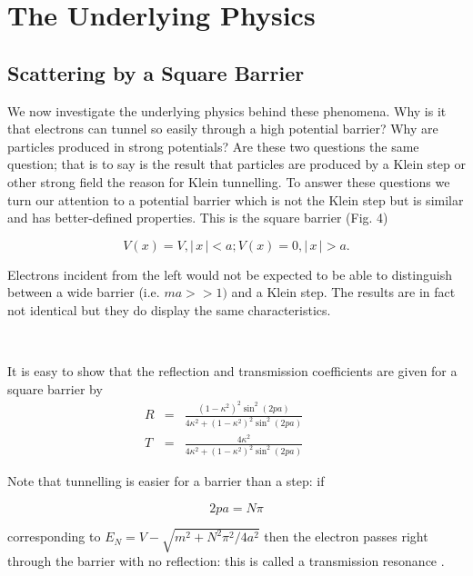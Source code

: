 \section{The Underlying Physics}

\subsection{Scattering by a Square Barrier}

\noindent We now investigate the underlying physics behind these phenomena.
Why is it that electrons can tunnel so easily through a high potential
barrier? Why are particles produced in strong potentials? Are these two
questions the same question; that is to say is the result that particles are
produced by a Klein step or other strong field the reason for Klein
tunnelling. To answer these questions we turn our attention to a potential
barrier which is not the Klein step but is similar and has better-defined
properties. This is the square barrier (Fig. 4)

\begin{equation}
V(x)=V,|\,x\,|<a;V(x)=0,|\,x\,|>a.  \label{barreq}
\end{equation}

\noindent Electrons incident from the left would not be expected to be able
to distinguish between a wide barrier (i.e. $ma>>1)$ and a Klein step. The
results are in fact not identical but they do display the same
characteristics.

\smallskip\ 

\noindent It is easy to show that the reflection and transmission
coefficients are given for a square barrier by \cite{jens} 
\begin{eqnarray}
R &=&\frac{(1-\kappa ^2)^2\sin ^2(2pa)}{4\kappa ^2+(1-\kappa ^2)^2\sin
^2(2pa)}\qquad  \label{barr} \\
T &=&\frac{4\kappa ^2}{4\kappa ^2+(1-\kappa ^2)^2\sin ^2(2pa)}
\end{eqnarray}

\noindent Note that tunnelling is easier for a barrier than a step: if

\begin{equation}  \label{quant}
2pa=N\pi
\end{equation}

\noindent corresponding to $E_N=V-\sqrt{m^2+N^2\pi ^2/4a^2}$ then the
electron passes right through the barrier with no reflection: this is called
a transmission resonance \cite{cdi}.

